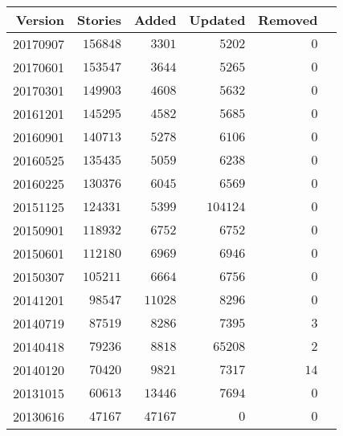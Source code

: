 \documentclass[hidelinks,a4paper,12pt]{article}
\begin{document}
\begin{center}
\begin{tabular}{|r|r|r|r|r|r|} \hline
\textbf{Version} & \textbf{Stories} & \textbf{Added} & \textbf{Updated} & \textbf{Removed} \\ \hline
20170907         & $156848$         & $3301$         & $5202$           & $0$              \\ \hline
20170601         & $153547$         & $3644$         & $5265$           & $0$              \\ \hline
20170301         & $149903$         & $4608$         & $5632$           & $0$              \\ \hline
20161201         & $145295$         & $4582$         & $5685$           & $0$              \\ \hline
20160901         & $140713$         & $5278$         & $6106$           & $0$              \\ \hline
20160525         & $135435$         & $5059$         & $6238$           & $0$              \\ \hline
20160225         & $130376$         & $6045$         & $6569$           & $0$              \\ \hline
20151125         & $124331$         & $5399$         & $104124$         & $0$              \\ \hline
20150901         & $118932$         & $6752$         & $6752$           & $0$              \\ \hline
20150601         & $112180$         & $6969$         & $6946$           & $0$              \\ \hline
20150307         & $105211$         & $6664$         & $6756$           & $0$              \\ \hline
20141201         & $98547$          & $11028$        & $8296$           & $0$              \\ \hline
20140719         & $87519$          & $8286$         & $7395$           & $3$              \\ \hline
20140418         & $79236$          & $8818$         & $65208$          & $2$              \\ \hline
20140120         & $70420$          & $9821$         & $7317$           & $14$             \\ \hline
20131015         & $60613$          & $13446$        & $7694$           & $0$              \\ \hline
20130616         & $47167$          & $47167$        & $0$              & $0$              \\ \hline
\end{tabular}
\end{center}
\end{document}
